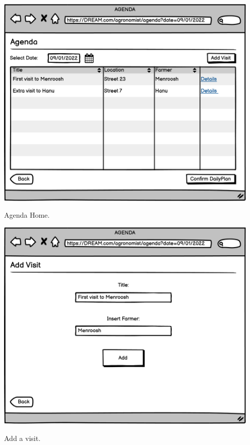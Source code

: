 \vspace{0.5cm}
\begin{minipage}{.5\textwidth}
	\centering
	\includegraphics[width=0.95\textwidth]{Images/Mockup/Agronomist/05AgronomistAgenda.png}
	\captionsetup{type=figure}
	\caption{Agenda Home.}
\end{minipage}%
\begin{minipage}{.5\textwidth}
	\centering
	\includegraphics[width=0.95\textwidth]{Images/Mockup/Agronomist/06AgronomistAgendaAddVisit.png}
	\captionsetup{type=figure}
	\caption{Add a visit.}
\end{minipage}
\vspace{0.5cm}
